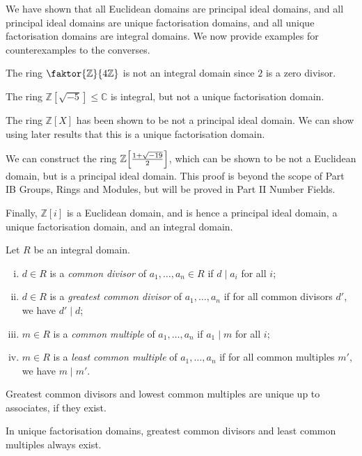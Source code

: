 \begin{example}
	We have shown that all Euclidean domains are principal ideal domains, and all principal ideal domains are unique factorisation domains, and all unique factorisation domains are integral domains.
	We now provide examples for counterexamples to the converses.

	The ring \( \faktor{\mathbb Z}{4\mathbb Z} \) is not an integral domain since \( 2 \) is a zero divisor.

	The ring \( \mathbb Z[\sqrt{-5}] \leq \mathbb C \) is integral, but not a unique factorisation domain.

	The ring \( \mathbb Z[X] \) has been shown to be not a principal ideal domain. We can show using later results that this is a unique factorisation domain.

	We can construct the ring \( \mathbb Z\qty[\frac{1+\sqrt{-19}}{2}] \), which can be shown to be not a Euclidean domain, but is a principal ideal domain.
	This proof is beyond the scope of Part IB Groups, Rings and Modules, but will be proved in Part II Number Fields.

	Finally, \( \mathbb Z[i] \) is a Euclidean domain, and is hence a principal ideal domain, a unique factorisation domain, and an integral domain.
\end{example}
\begin{definition}
	Let \( R \) be an integral domain.
	\begin{enumerate}[(i)]
		\item \( d \in R \) is a \textit{common divisor} of \( a_1, \dots, a_n \in R \) if \( d \mid a_i \) for all \( i \);
		\item \( d \in R \) is a \textit{greatest common divisor} of \( a_1, \dots, a_n \) if for all common divisors \( d' \), we have \( d' \mid d \);
		\item \( m \in R \) is a \textit{common multiple} of \( a_1, \dots, a_n \) if \( a_1 \mid m \) for all \( i \);
		\item \( m \in R \) is a \textit{least common multiple} of \( a_1, \dots, a_n \) if for all common multiples \( m' \), we have \( m \mid m' \).
	\end{enumerate}
\end{definition}
\begin{remark}
	Greatest common divisors and lowest common multiples are unique up to associates, if they exist.
\end{remark}
\begin{proposition}
	In unique factorisation domains, greatest common divisors and least common multiples always exist.
\end{proposition}
